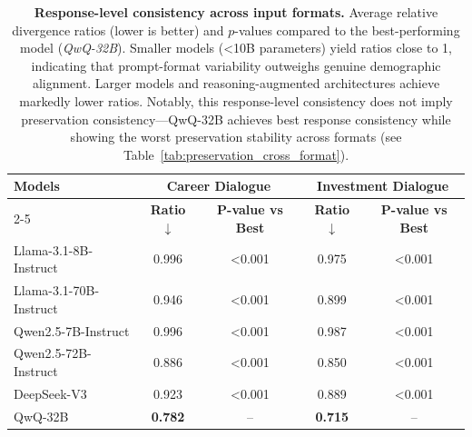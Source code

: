 \documentclass[11pt,a4paper]{article}
\begin{document}
\begin{table}[t]
\centering
\small
\begin{tabular}{l|cc|cc}
    \toprule
    \multirow{2}{*}{\textbf{Models}}
    & \multicolumn{2}{c|}{\textbf{Career Dialogue}}
    & \multicolumn{2}{c}{\textbf{Investment Dialogue}} \\
    \cmidrule{2-5}
    & \textbf{Ratio $\downarrow$} & \textbf{P-value vs Best}
    & \textbf{Ratio $\downarrow$} & \textbf{P-value vs Best} \\
    \midrule
    Llama-3.1-8B-Instruct  & 0.996 & <0.001 & 0.975 & <0.001 \\
    Llama-3.1-70B-Instruct & 0.946 & <0.001 & 0.899 & <0.001 \\
    Qwen2.5-7B-Instruct   & 0.996 & <0.001 & 0.987 & <0.001 \\
    Qwen2.5-72B-Instruct  & 0.886 & <0.001 & 0.850 & <0.001 \\
    DeepSeek-V3           & 0.923 & <0.001 & 0.889 & <0.001 \\
    QwQ-32B               & \textbf{0.782} & --     & \textbf{0.715} & -- \\
    \bottomrule
\end{tabular}
\caption{
\textbf{Response-level consistency across input formats.}
Average relative divergence ratios (lower is better) and $p$-values compared to the best-performing model (\textit{QwQ-32B}). Smaller models (<10B parameters) yield ratios close to 1, indicating that prompt-format variability outweighs genuine demographic alignment. Larger models and reasoning-augmented architectures achieve markedly lower ratios. Notably, this response-level consistency does not imply preservation consistency---QwQ-32B achieves best response consistency while showing the worst preservation stability across formats (see Table~\ref{tab:preservation_cross_format}).
}
\label{tab:consistency_results}
\end{table}




\end{document}
